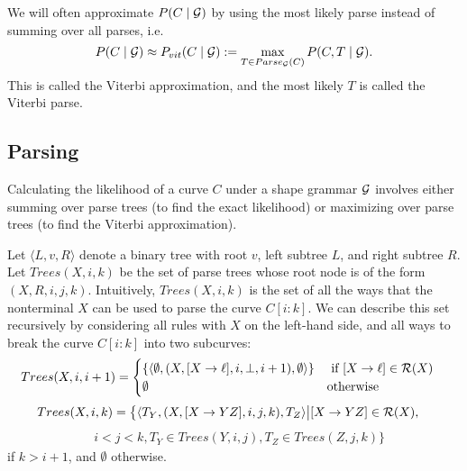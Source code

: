 \def\Vbin{\ema{V_{bin}}}
\def\Vlex{\ema{V_{lex}}}
\newcommand\unirule[1]{\ema{[#1 \to \ell]}}
\newcommand\binrule[3]{\ema{[#1 \to #2 #3]}}
\newcommand\parseset[1]{\ema{Parse_{\GGG}(#1)}}

We will often approximate $P(C\mid {\mathcal G})$ by using the most likely
parse instead of summing over all parses, i.e.
$$P(C\mid\GGG) \approx P_{vit}(C\mid\GGG) := \max_{T\in \parseset{C}}
P(C,T\mid \GGG).$$ This is called the Viterbi approximation, and the
most likely $T$ is called the Viterbi parse.

\subsection{Parsing}
\label{sec-parsing}

Calculating the likelihood of a curve $C$ under a shape grammar ${\mathcal G}$
involves either summing over parse trees (to find the exact
likelihood) or maximizing over parse trees (to find the Viterbi
approximation). 

Let $\langle L,v,R\rangle$ denote a binary tree with root $v$, left
subtree $L$, and right subtree $R$. Let $Trees(X,i,k)$ be the set of
parse trees whose root node is of the form $(X,R,i,j,k)$. Intuitively,
$Trees(X,i,k)$ is the set of all the ways that the nonterminal $X$ can
be used to parse the curve $C[i:k]$. We can describe this set
recursively by considering all rules with $X$ on the left-hand side,
and all ways to break the curve $C[i:k]$ into two subcurves:
\begin{align*}
\label{recursive-trees}
Trees(X,i,i+1) &= \begin{cases}
\{ \langle \emptyset, (X, [X\to \ell],i,\bot,i+1), \emptyset\rangle\} &
\mbox{ if } [X \to \ell] \in \RRR(X)\\
\emptyset & \mbox{otherwise}\end{cases}
\end{align*}
\begin{align}
Trees(X,i,k) = \big\{ &\langle T_Y, (X, [X\to YZ], i, j, k), T_Z \rangle \big| [X\to YZ] \in {\mathcal R}(X), 
\end{align}\begin{align*}
&i < j < k, T_Y\in Trees(Y,i,j), T_Z\in Trees(Z,j,k)\big\}
\end{align*}
if $k > i+1$, and $\emptyset$ otherwise.

